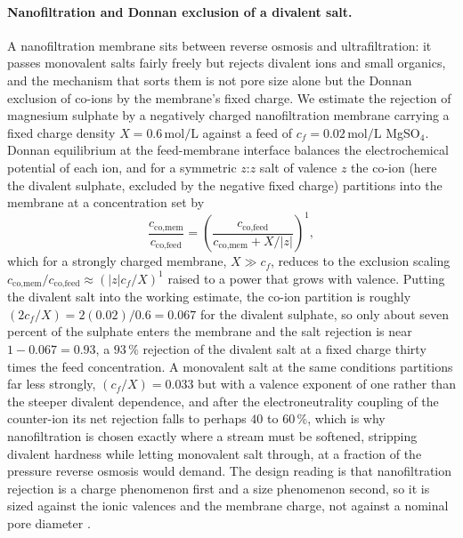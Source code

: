 

\paragraph{Nanofiltration and Donnan exclusion of a divalent salt.} A
nanofiltration membrane sits between reverse osmosis and ultrafiltration: it
passes monovalent salts fairly freely but rejects divalent ions and small
organics, and the mechanism that sorts them is not pore size alone but the
Donnan exclusion of co-ions by the membrane's fixed charge. We estimate the
rejection of magnesium sulphate by a negatively charged nanofiltration membrane
carrying a fixed charge density $X = 0.6\,\text{mol/L}$ against a feed of
$c_f = 0.02\,\text{mol/L}$ MgSO$_4$. Donnan equilibrium at the feed-membrane
interface balances the electrochemical potential of each ion, and for a
symmetric $z$:$z$ salt of valence $z$ the co-ion (here the divalent sulphate,
excluded by the negative fixed charge) partitions into the membrane at a
concentration set by
\[
\frac{c_{\text{co,mem}}}{c_{\text{co,feed}}} =
\left(\frac{c_{\text{co,feed}}}{c_{\text{co,mem}} + X/|z|}\right)^{1},
\]
which for a strongly charged membrane, $X \gg c_f$, reduces to the exclusion
scaling $c_{\text{co,mem}}/c_{\text{co,feed}} \approx (|z| c_f/X)^{1}$ raised to
a power that grows with valence. Putting the divalent salt into the working
estimate, the co-ion partition is roughly $(2 c_f/X) = 2(0.02)/0.6 = 0.067$ for
the divalent sulphate, so only about seven percent of the sulphate enters the
membrane and the salt rejection is near $1 - 0.067 = 0.93$, a $93\,\%$
rejection of the divalent salt at a fixed charge thirty times the feed
concentration. A monovalent salt at the same conditions partitions far less
strongly, $(c_f/X) = 0.033$ but with a valence exponent of one rather than the
steeper divalent dependence, and after the electroneutrality coupling of the
counter-ion its net rejection falls to perhaps $40$ to $60\,\%$, which is why
nanofiltration is chosen exactly where a stream must be softened, stripping
divalent hardness while letting monovalent salt through, at a fraction of the
pressure reverse osmosis would demand. The design reading is that
nanofiltration rejection is a charge phenomenon first and a size phenomenon
second, so it is sized against the ionic valences and the membrane charge, not
against a nominal pore diameter \cite{text:perry-chemical-engineers}.


